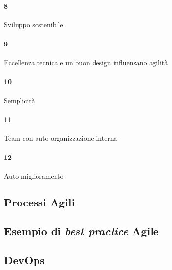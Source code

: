 \paragraph{8}
Sviluppo sostenibile
\paragraph{9}
Eccellenza tecnica e un buon design influenzano agilità
\paragraph{10}
Semplicità
\paragraph{11}
Team con auto-organizzazione interna
\paragraph{12}
Auto-miglioramento

\subsection{Processi Agili}

\subsection{Esempio di \textit{best practice} Agile}

\subsection{DevOps}